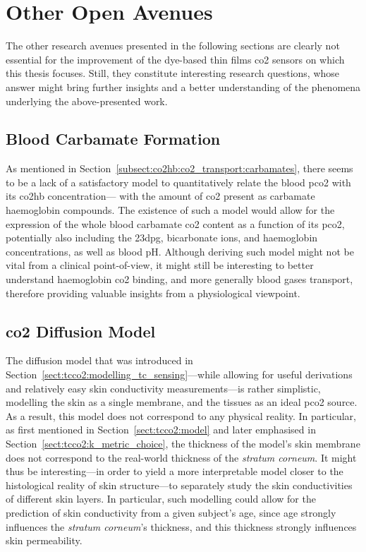 \section{Other Open Avenues}

The other research avenues presented in the following sections are clearly not essential for the improvement of the dye-based thin films \gls{co2} sensors on which this thesis focuses. Still, they constitute interesting research questions, whose answer might bring further insights and a better understanding of the phenomena underlying the above-presented work.

\subsection{Blood Carbamate Formation}

As mentioned in Section~\ref{subsect:co2hb:co2_transport:carbamates}, there seems to be a lack of a satisfactory model to quantitatively relate the blood \gls{pco2} with its \gls{co2hb} concentration---\ie{} with the amount of \gls{co2} present as carbamate haemoglobin compounds. The existence of such a model would allow for the expression of the whole blood carbamate \gls{co2} content as a function of its \gls{pco2}, potentially also including the \gls{23dpg}, bicarbonate ions, and haemoglobin concentrations, as well as blood pH. Although deriving such model might not be vital from a clinical point-of-view, it might still be interesting to better understand haemoglobin \gls{co2} binding, and more generally blood gases transport, therefore providing valuable insights from a physiological viewpoint.

\subsection{\texorpdfstring{\gls{co2}}{CO2} Diffusion Model}

The diffusion model that was introduced in Section~\ref{sect:tcco2:modelling_tc_sensing}---while allowing for useful derivations and relatively easy skin conductivity measurements---is rather simplistic, modelling the skin as a single membrane, and the tissues as an ideal \gls{pco2} source. As a result, this model does not correspond to any physical reality. In particular, as first mentioned in Section~\ref{sect:tcco2:model} and later emphasised in Section~\ref{sect:tcco2:k_metric_choice}, the thickness of the model's skin membrane does not correspond to the real-world thickness of the \textit{stratum corneum}. It might thus be interesting---in order to yield a more interpretable model closer to the histological reality of skin structure---to separately study the skin conductivities of different skin layers. In particular, such modelling could allow for the prediction of skin conductivity from a given subject's age, since age strongly influences the \textit{stratum corneum}'s thickness\cite{branchet1990}, and this thickness strongly influences skin permeability\cite{scheuplein1976}.

